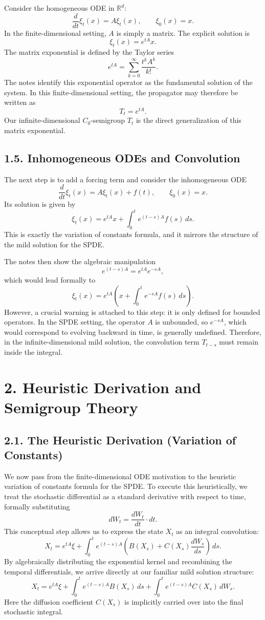 \documentclass[11pt]{article}
\theoremstyle{definition}
\theoremstyle{remark}
\begin{document}
Consider the homogeneous ODE in \(\mathbb R^d\):
\[
\frac{d}{dt}\xi_t(x)=A\xi_t(x),
\qquad
\xi_0(x)=x.
\]
In the finite-dimensional setting, \(A\) is simply a matrix. The explicit solution is
\[
\xi_t(x)=e^{tA}x.
\]
The matrix exponential is defined by the Taylor series
\[
e^{tA}
=
\sum_{k=0}^{\infty}\frac{t^kA^k}{k!}.
\]
The notes identify this exponential operator as the fundamental solution of the system. In this finite-dimensional setting, the propagator may therefore be written as
\[
T_t=e^{tA}.
\]
Our infinite-dimensional \(C_0\)-semigroup \(T_t\) is the direct generalization of this matrix exponential.

\subsection*{1.5. Inhomogeneous ODEs and Convolution}
The next step is to add a forcing term and consider the inhomogeneous ODE
\[
\frac{d}{dt}\xi_t(x)=A\xi_t(x)+f(t),
\qquad
\xi_0(x)=x.
\]
Its solution is given by
\[
\xi_t(x)=e^{tA}x+\int_0^t e^{(t-s)A}f(s)\,ds.
\]
This is exactly the variation of constants formula, and it mirrors the structure of the mild solution for the SPDE.

The notes then show the algebraic manipulation
\[
e^{(t-s)A}=e^{tA}e^{-sA},
\]
which would lead formally to
\[
\xi_t(x)
=
e^{tA}\left(x+\int_0^t e^{-sA}f(s)\,ds\right).
\]
However, a crucial warning is attached to this step: it is only defined for bounded operators. In the SPDE setting, the operator \(A\) is unbounded, so \(e^{-sA}\), which would correspond to evolving backward in time, is generally undefined. Therefore, in the infinite-dimensional mild solution, the convolution term \(T_{t-s}\) must remain inside the integral.

\section*{2. Heuristic Derivation and Semigroup Theory}
\subsection*{2.1. The Heuristic Derivation (Variation of Constants)}
We now pass from the finite-dimensional ODE motivation to the heuristic variation of constants formula for the SPDE. To execute this heuristically, we treat the stochastic differential as a standard derivative with respect to time, formally substituting
\[
dW_t
=
\frac{dW_t}{dt}\cdot dt.
\]
This conceptual step allows us to express the state \(X_t\) as an integral convolution:
\[
X_t
=
e^{tA}\xi+\int_0^t e^{(t-s)A}\left(B(X_s)+C(X_s)\frac{dW_s}{ds}\right)\,ds.
\]
By algebraically distributing the exponential kernel and recombining the temporal differentials, we arrive directly at our familiar mild solution structure:
\[
X_t
=
e^{tA}\xi+\int_0^t e^{(t-s)A}B(X_s)\,ds+\int_0^t e^{(t-s)A}C(X_s)\,dW_s.
\]
Here the diffusion coefficient \(C(X_s)\) is implicitly carried over into the final stochastic integral.
\end{document}
